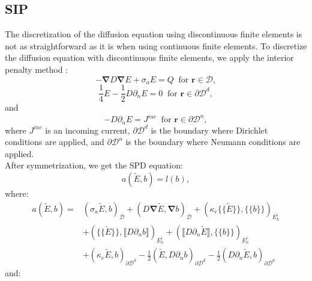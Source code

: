 \documentclass[preprint,10pt]{elsarticle}
\newcommand\bn{\boldsymbol{\nabla}}
\newcommand\br{\mathbf{r}}
\newcommand\ldb{\{\!\!\{}
\newcommand\rdb{\}\!\!\}}
\newcommand\llb{\llbracket}
\newcommand\rrb{\rrbracket}
\newcommand\mc{\mathcal}
\renewcommand{\(}{\left(}
\renewcommand{\)}{\right)}
\renewcommand{\[}{\left[}
\renewcommand{\]}{\right]}
\begin{document}
 
\subsection{SIP}

The discretization of the diffusion equation using discontinuous finite
elements is not as straightforward as it is when using continuous finite
elements. To discretize the diffusion equation with discontinuous finite elements, 
we apply the interior penalty method \cite{Kanschat2007}:
\begin{equation}
  -\bn D \bn E + \sigma_a E = Q\ \textrm{ for } \br \in \mc{D},
\end{equation}
\begin{equation}
  \frac{1}{4} E - \frac{1}{2} D \partial_n E =0\ \textrm{ for } \br \in
  \partial \mc{D}^d,
\end{equation}
and
\begin{equation}
  -D \partial_n E = J^{inc}\ \textrm{ for } \br \in \partial \mc{D}^n,
\end{equation}
where $J^{inc}$ is an incoming current, $\partial \mc{D}^d$ is the boundary 
where Dirichlet conditions are applied, and $\partial \mc{D}^n$ is the boundary 
where Neumann conditions are applied.\\ 
After symmetrization, we get the SPD equation:
\begin{equation}
  a(\tilde{E},b) = l(b),
\end{equation}
where:
\begin{equation}
  \begin{split}
    a (\tilde{E},b) =& \(\sigma_a \tilde{E},b\)_{\mc{D}} + 
    \(D\bn\tilde{E},\bn b\)_{\mc{D}} +
    (\kappa_e\ldb\tilde{E}\rdb,\ldb b \rdb)_{E_h^i}\\
    &+ \(\ldb\tilde{E}\rdb,\llb D\partial_n b \rrb\)_{E_h^i}+ \(\llb D
    \partial_n \tilde{E}\rrb,\ldb b \rdb\)_{E_h^i}\\
    &+ \(\kappa_e \tilde{E}, b\)_{\partial \mc{D}^d}
    -\frac{1}{2}\(\tilde{E},D\partial_n b\)_{\partial \mc{D}^d}
    -\frac{1}{2}\(D\partial_n\tilde{E},b\)_{\partial \mc{D}^d}
  \end{split}
\end{equation}
and:
\end{document}
